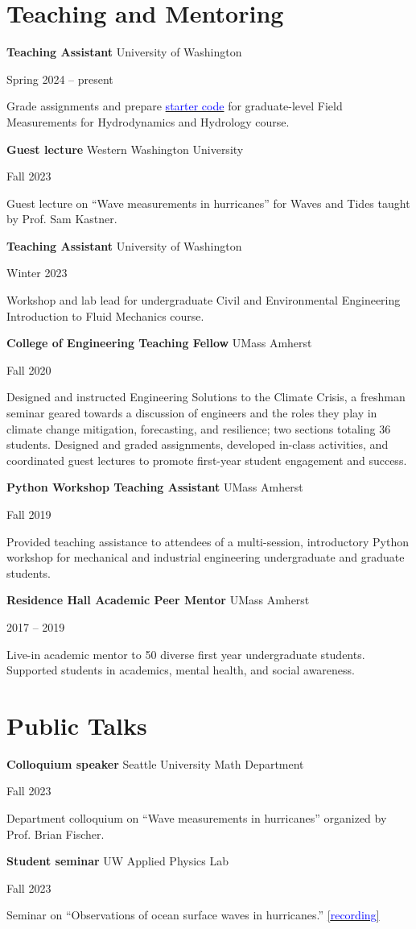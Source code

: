 \documentclass[letterpaper,11pt]{article}
\newenvironment{indentPar}[1]{
  \justifying
  \begin{list}{}{\setlength{\leftmargin}{#1}}%
  \item[]
}
{\end{list}}
\newcommand{\teachingExpEntry}[4]{
  \begin{minipage}[t]{.74\textwidth}
    \begin{flushleft}
      \textbf{#1}
      #2
    \end{flushleft}
  \end{minipage}
  \hfill
  \begin{minipage}[t]{.25\textwidth}
    \begin{flushright}
      #3%
    \end{flushright}
  \end{minipage}%
  \vspace{-7pt}
  \begin{indentPar}{0.5cm}
    #4%
  \end{indentPar}
}
\newcommand{\mentorshipExpEntry}[4]{
  \begin{minipage}[t]{.75\textwidth}
    \begin{flushleft}
      \textbf{#1}
      #2
    \end{flushleft}
  \end{minipage}
  \hfill
  \begin{minipage}[t]{.20\textwidth}
    \begin{flushright}
      #3%
    \end{flushright}
  \end{minipage}%
  \vspace{-7pt}
  \begin{indentPar}{0.5cm}
    #4%
  \end{indentPar}
}
\begin{document}
\break

\section{Teaching and Mentoring}
\teachingExpEntry
  {Teaching Assistant}{University of Washington}
  {Spring 2024 -- present}
  {Grade assignments and prepare \href{https://github.com/SASlabgroup/CEWA590-starter-codes}{\textcolor{blue}{starter code}} for graduate-level Field Measurements for Hydrodynamics and Hydrology course.}  %
%
\teachingExpEntry
  {Guest lecture}{Western Washington University}
  {Fall 2023}
  {Guest lecture on ``Wave measurements in hurricanes'' for Waves and Tides taught by Prof. Sam Kastner.}
%
%
\teachingExpEntry
  {Teaching Assistant}{University of Washington}
  {Winter 2023}
  {Workshop and lab lead for undergraduate Civil and Environmental Engineering Introduction to Fluid Mechanics course.}
%
\teachingExpEntry
  {College of Engineering Teaching Fellow}{UMass Amherst}
  {Fall 2020}
  {Designed and instructed Engineering Solutions to the Climate Crisis, a freshman seminar geared towards a discussion of engineers and the roles they play in climate change mitigation, forecasting, and resilience; two sections totaling 36 students. Designed and graded assignments, developed in-class activities, and coordinated guest lectures to promote first-year student engagement and success.}
%
\teachingExpEntry
  {Python Workshop Teaching Assistant}{UMass Amherst}
  {Fall 2019}
  {Provided teaching assistance to attendees of a multi-session, introductory Python workshop for mechanical and industrial engineering undergraduate and graduate students.}
%
\mentorshipExpEntry
  {Residence Hall Academic Peer Mentor}{UMass Amherst}
  {2017 -- 2019}
  {Live-in academic mentor to 50 diverse first year undergraduate students. Supported students in academics, mental health, and social awareness.}
%


\section{Public Talks}
\teachingExpEntry
  {Colloquium speaker}{Seattle University Math Department}
  {Fall 2023}
  {Department colloquium on ``Wave measurements in hurricanes'' organized by Prof. Brian Fischer.}
%
\teachingExpEntry
  {Student seminar}{UW Applied Physics Lab}
  {Fall 2023}
  {Seminar on ``Observations of ocean surface waves in hurricanes.'' \href{https://www.youtube.com/watch?v=SwlrFTNu7xE}{[\textcolor{blue}{recording}]}}
%
\end{document}
